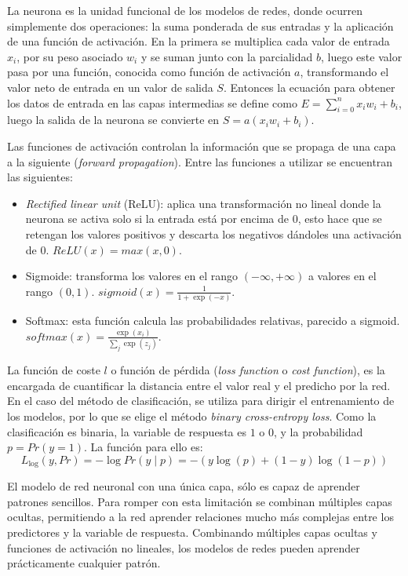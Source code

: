     La neurona es la unidad funcional de los modelos de redes, donde ocurren simplemente dos operaciones: la suma ponderada de sus entradas y la aplicaci\'{o}n de una funci\'{o}n de activaci\'{o}n. En la primera se multiplica cada valor de entrada $x_{i}$, por su peso asociado $w_{i}$ y se suman junto con la parcialidad $b$, luego este valor pasa por una funci\'{o}n, conocida como funci\'{o}n de activaci\'{o}n $a$, transformando el valor neto de entrada en un valor de salida $S$. Entonces la ecuaci\'{o}n para obtener los datos de entrada en las capas intermedias se define como $E=\sum_{i=0}^{n}x_{i}w_{i}+b_{i}$, luego la salida de la neurona se convierte en $S=a(x_{i} w_{i}+b_{i})$.
    
    Las funciones de activaci\'{o}n controlan la informaci\'{o}n que se propaga de una capa a la siguiente (\textit{forward propagation}). Entre las funciones a utilizar se encuentran las siguientes:
    
    \begin{itemize}
    	\item \textit{Rectified linear unit} (ReLU): aplica una transformaci\'{o}n no lineal donde la neurona se activa solo si la entrada est\'{a} por encima de $0$, esto hace que se retengan los valores positivos y descarta los negativos d\'{a}ndoles una activaci\'{o}n de $0$. $ReLU(x)=max(x,0)$.
    	\item Sigmoide: transforma los valores en el rango $(-\infty,+\infty)$ a valores en el rango $(0,1)$. $sigmoid(x)=\frac{1}{1+\exp(-x)}$.
    	\item Softmax: esta funci\'{o}n calcula las probabilidades relativas, parecido a sigmoid. $softmax(x)=\frac{\exp(x_{i})}{\sum_{j}\exp(z_{j})}$.
    \end{itemize}

    La funci\'{o}n de coste $l$ o funci\'{o}n de p\'{e}rdida (\textit{loss function} o \textit{cost function}), es la encargada de cuantificar la distancia entre el valor real y el predicho por la red. En el caso del m\'{e}todo de clasificaci\'{o}n, se utiliza para dirigir el entrenamiento de los modelos, por lo que se elige el m\'{e}todo \textit{binary cross-entropy loss}. Como la clasificaci\'{o}n es binaria, la variable de respuesta es $1$ o $0$, y la probabilidad $p=Pr(y=1)$. La funci\'{o}n para ello es:
    \begin{equation}
    	L_{\log} (y,Pr)=-\log Pr(y\mid p)=-(y\log(p)+(1-y)\log(1-p))
    \end{equation}
  
    El modelo de red neuronal con una \'{u}nica capa, s\'{o}lo es capaz de aprender patrones sencillos. Para romper con esta limitaci\'{o}n se combinan m\'{u}ltiples capas ocultas, permitiendo a la red aprender relaciones mucho m\'{a}s complejas entre los predictores y la variable de respuesta. Combinando m\'{u}ltiples capas ocultas y funciones de activaci\'{o}n no lineales, los modelos de redes pueden aprender pr\'{a}cticamente cualquier patr\'{o}n.
  
